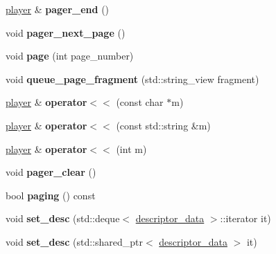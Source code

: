 \begin{DoxyCompactItemize}
\hyperlink{classmods_1_1player}{player} \& {\bfseries pager\+\_\+end} ()
\item 
\mbox{\label{classmods_1_1player_a90fb7668ff623bce96c51255fc10b287}} 
void {\bfseries pager\+\_\+next\+\_\+page} ()
\item 
\mbox{\label{classmods_1_1player_ac86a2bee53a0931b3ebed1ec18385ae0}} 
void {\bfseries page} (int page\+\_\+number)
\item 
\mbox{\label{classmods_1_1player_a43832fcf34ddb3e7968a26703d3250cd}} 
void {\bfseries queue\+\_\+page\+\_\+fragment} (std\+::string\+\_\+view fragment)
\item 
\mbox{\label{classmods_1_1player_ac6c0d4b3f9047117ef797698df4b7306}} 
\hyperlink{classmods_1_1player}{player} \& {\bfseries operator$<$$<$} (const char $\ast$m)
\item 
\mbox{\label{classmods_1_1player_ad09209c13b4f58e1bcd51897f8bb1feb}} 
\hyperlink{classmods_1_1player}{player} \& {\bfseries operator$<$$<$} (const std\+::string \&m)
\item 
\mbox{\label{classmods_1_1player_a5c60061a3e82ade30f6b3ba5d94f7227}} 
\hyperlink{classmods_1_1player}{player} \& {\bfseries operator$<$$<$} (int m)
\item 
\mbox{\label{classmods_1_1player_a09de19290c2191f95d8e07937c76dc1d}} 
void {\bfseries pager\+\_\+clear} ()
\item 
\mbox{\label{classmods_1_1player_a2ee6cf11d335225a4e2e035d419b8076}} 
bool {\bfseries paging} () const
\item 
\mbox{\label{classmods_1_1player_ad8b5e48c762c234c99406dbb9d4510bb}} 
void {\bfseries set\+\_\+desc} (std\+::deque$<$ \hyperlink{structmods_1_1descriptor__data}{descriptor\+\_\+data} $>$\+::iterator it)
\item 
\mbox{\label{classmods_1_1player_a573f41de9bcd357412059bf016ebde78}} 
void {\bfseries set\+\_\+desc} (std\+::shared\+\_\+ptr$<$ \hyperlink{structmods_1_1descriptor__data}{descriptor\+\_\+data} $>$ it)

\end{DoxyCompactItemize}
